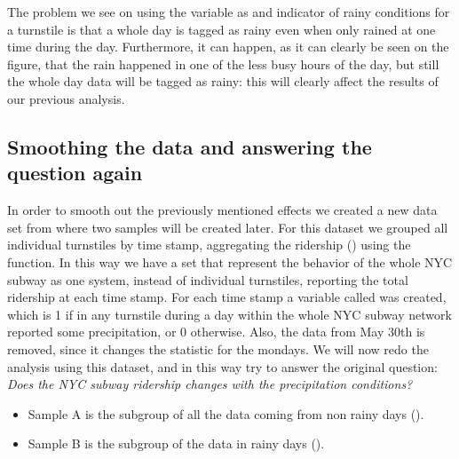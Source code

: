 \documentclass[a4paper,12pt,english]{sphinxmanual}
\begin{document}
The problem we see on using the  variable as and indicator of rainy
conditions for a turnstile is that a whole day is tagged as rainy even when only
rained at one time during the day. Furthermore, it can happen, as it can clearly
be seen on the figure, that the rain happened in one of the less busy hours of
the day, but still the whole day data will be tagged as rainy: this will clearly
affect the results of our previous analysis.


\subsection{Smoothing the data and answering the question again}
\label{section1:smoothing-the-data-and-answering-the-question-again}
In order to smooth out the previously mentioned effects we created a new data
set from where two samples will be created later. For this dataset we grouped
all individual turnstiles by time stamp, aggregating the ridership
() using the  function. In this way we have a set that
represent the behavior of the whole NYC subway as one system, instead of
individual turnstiles, reporting the total ridership at each time stamp. For
each time stamp a variable called  was created, which is 1 if in any
turnstile during a day within the whole NYC subway network reported some
precipitation, or 0 otherwise. Also, the data from May 30th is removed, since it
changes the statistic for the mondays. We will now redo the analysis using this
dataset, and in this way try to answer the original question:
\emph{Does the NYC subway ridership changes with the precipitation conditions?}
\begin{itemize}
\item {} 
Sample A is the subgroup of all the data coming from non rainy days
().

\item {} 
Sample B is the subgroup of the data in rainy days ().

\end{itemize}
\end{document}
